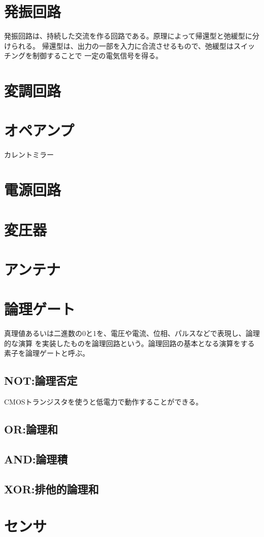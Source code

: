     \section{発振回路}
        発振回路は、持続した交流を作る回路である。原理によって帰還型と弛緩型に分けられる。
        帰還型は、出力の一部を入力に合流させるもので、弛緩型はスイッチングを制御することで
        一定の電気信号を得る。
    \section{変調回路}
    \section{オペアンプ}
        カレントミラー
    \section{電源回路}
    \section{変圧器}
    \section{アンテナ}
    \section{論理ゲート}
        真理値あるいは二進数の0と1を、電圧や電流、位相、パルスなどで表現し、論理的な演算
        を実装したものを論理回路という。論理回路の基本となる演算をする素子を論理ゲートと呼ぶ。
        \subsection{NOT:論理否定}
            CMOSトランジスタを使うと低電力で動作することができる。
        \subsection{OR:論理和}
        \subsection{AND:論理積}
        \subsection{XOR:排他的論理和}
    \section{センサ}